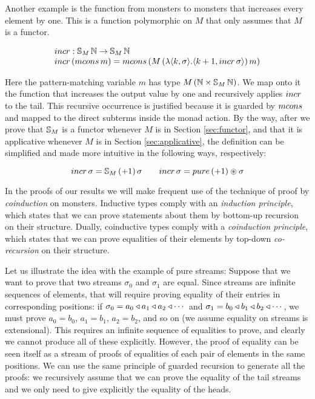 Another example is the function from monsters to monsters that increases every element by one.
This is a function polymorphic on $M$ that only assumes that $M$ is a functor.

$$
\begin{array}{l}
\incr : \stream{M}\,\nat \rightarrow \stream{M}\,\nat\\
\incr\,(\mcons\,m) = \mcons\,(M\,(\lambda \pair{k}{\sigma}. \pair{k+1}{\incr\,\sigma})\,m)
\end{array}
$$

Here the pattern-matching variable $m$ has type $M\,(\mathbb{N}\times \mathbb{S}_{M}\,\mathbb{N})$.
We map onto it the function that increases the output value by one and recursively applies $\incr$ to the tail.
This recursive occurrence is justified because it is guarded by $\mcons$ and mapped to the direct subterms inside the monad action.
By the way,
after we prove that $\mathbb{S}_{M}$ is a functor whenever $M$ is in Section \ref{sec:functor}, and that it is applicative whenever $M$ is in Section \ref{sec:applicative},
the definition can be simplified and made more intuitive in the following ways, respectively:

$$
\incr\,\sigma = \stream{M}\,(+1)\,\sigma
\qquad
\incr\,\sigma = \apure\,(+1) \appl \sigma
$$

In the proofs of our results we will make frequent use of the technique of proof by {\em coinduction} on monsters.
Inductive types comply with an {\em induction principle}, which states that we can prove statements about them by bottom-up recursion on their structure.
Dually, coinductive types comply with a {\em coinduction principle}, which states that we can prove equalities of their elements by top-down {\em co-recursion} on their structure.

Let us illustrate the idea with the example of pure streams:
Suppose that we want to prove that two streams $\sigma_0$ and $\sigma_1$ are equal.
Since streams are infinite sequences of elements, that will require proving equality of their entries in corresponding positions: if $\sigma_0 = a_0\triangleleft a_1\triangleleft a_2\triangleleft \cdots$ and  $\sigma_1 = b_0\triangleleft b_1\triangleleft b_2\triangleleft \cdots$, we must prove $a_0 = b_0$, $a_1 = b_1$, $a_2=b_2$, and so on (we assume equality on streams is extensional).
This requires an infinite sequence of equalities to prove, and clearly we cannot produce all of these explicitly.
However, the proof of equality can be seen itself as a stream of proofs of equalities of each pair of elements in the same positions.
We can use the same principle of guarded recursion to generate all the proofs: we recursively assume that we can prove the equality of the tail streams and we only need to give explicitly the equality of the heads.

